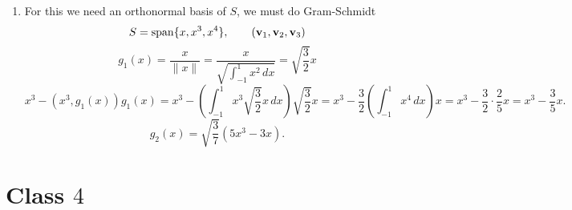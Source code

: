 \documentclass[10pt, a4paper]{article}
\begin{document}
\begin{problem}
\begin{solution}
\begin{enumerate}[label = (\alph*)]
            \item For this we need an orthonormal basis of $S$,
            we must do Gram-Schmidt
            \[
            S = \mathrm{span}\{x, x ^ 3, x ^ 4\},\qquad(\mathbf{v}_1, \mathbf{v}_2, \mathbf{v}_3)
            \]
            \[
            g_1(x) = \frac{x}{\|x\|} = \frac{x}{\sqrt{\int_{-1}^{1}x ^ 2\,dx}} = \sqrt{\frac{3}{2}}x
            \]
            \[
            x ^ 3 - (x ^ 3, g_1(x))g_1(x) = x ^ 3 - \left(\int_{-1}^{1}x ^ 3\sqrt{\frac{3}{2}}x\,dx\right)\sqrt{\frac{3}{2}}x = x ^ 3 - \frac{3}{2}\left(\int_{-1}^{1}x ^ 4\,dx\right)x = x ^ 3 - \frac{3}{2}\cdot\frac{2}{5}x = x ^ 3 - \frac{3}{5}x.
            \]
            \[
            g_2(x) = \sqrt{\frac{3}{7}}(5x ^ 3 - 3x).
            \]
            
        \end{enumerate}
    \end{solution}
\end{problem}

\newpage

\section{Class \texorpdfstring{$4$}{}}
\end{document}
